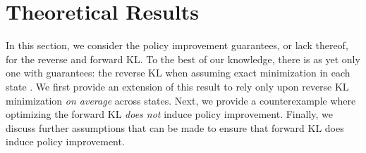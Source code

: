 \documentclass[twoside,11pt]{article}
\newcommand{\statespace}{\mathcal{S}}
\newcommand{\actionspace}{\mathcal{A}}
\newcommand{\Qhat}{{Q}}
\begin{document}


\section{Theoretical Results}

In this section, we consider the policy improvement guarantees, or lack thereof, for the reverse and forward KL. To the best of our knowledge, there is as yet only one with guarantees: the reverse KL when assuming exact minimization in each state \citep[Lemma 2]{haarnoja2018soft}. We first provide an extension of this result to rely only upon reverse KL minimization \textit{on average} across states. Next, we provide a counterexample where optimizing the forward KL \textit{does not} induce policy improvement.  Finally, we discuss further assumptions that can be made to ensure that forward KL does induce policy improvement.
\end{document}
